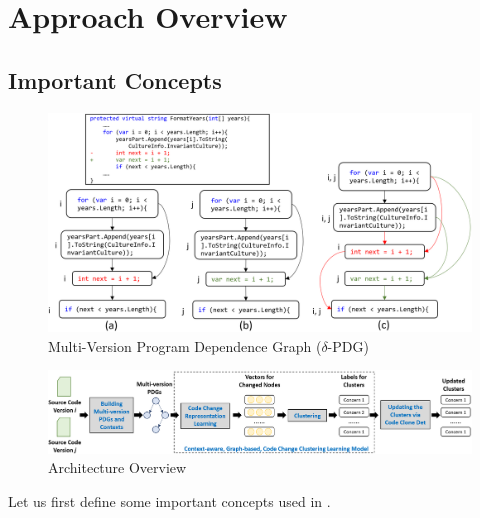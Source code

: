 \section{Approach Overview}
\label{overview:sec}

\subsection{Important Concepts}
\label{concepts:sec}

\begin{figure}[t]
	\centering
	\includegraphics[width=5.3in]{figures/multi-version-graph-2.png}
	\vspace{-6pt}
	\caption{Multi-Version Program Dependence Graph ($\delta$-PDG)}
	\label{fig:multi-version-pdg}
\end{figure}

\begin{figure}[t]
	\centering
 	\includegraphics[width=6.5in]{figures/overview.png}
	\vspace{-6pt}
	\caption{Architecture Overview}
	\label{fig:overview}
\end{figure}

Let us first define some important concepts used in {\tool}.


